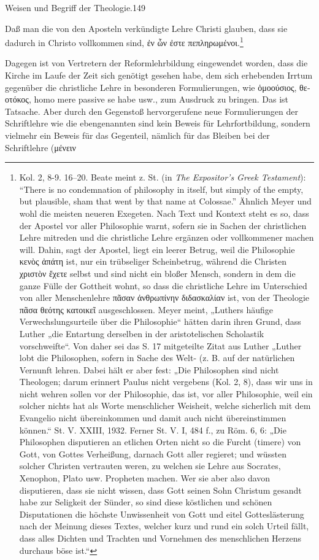 \noindent Weisen und Begriff der Theologie.\hfill 149\par Daß man die von den Aposteln verkündigte Lehre Christi glauben, dass sie dadurch in Christo vollkommen sind, \textgreek{ἐν ὧν ἐστε πεπληρωμένοι}.\footnote[511]{Kol. 2, 8-9. 16–20. Beate meint z. St. (in \emph{The Expositor's Greek Testament}): “There is no condemnation of philosophy in itself, but simply of the empty, but plausible, sham that went by that name at Colossae.” Ähnlich Meyer und wohl die meisten neueren Exegeten. Nach Text und Kontext steht es so, dass der Apostel vor aller Philosophie warnt, sofern sie in Sachen der christlichen Lehre mitreden und die christliche Lehre ergänzen oder vollkommener machen will. Dahin, sagt der Apostel, liegt ein leerer Betrug, weil die Philosophie \textgreek{κενὸς ἀπάτη} ist, nur ein trübseliger Scheinbetrug, während die Christen \textgreek{χριστὸν ἔχετε} selbst und sind nicht ein bloßer Mensch, sondern in dem die ganze Fülle der Gottheit wohnt, so dass die christliche Lehre im Unterschied von aller Menschenlehre \textgreek{πᾶσαν ἀνθρωπίνην διδασκαλίαν} ist, von der Theologie \textgreek{πᾶσα θεότης κατοικεῖ} ausgeschlossen. Meyer meint, „Luthers häufige Verwechslungsurteile über die Philosophie“ hätten darin ihren Grund, dass Luther „die Entartung derselben in der aristotelischen Scholastik vorschweifte“. Von daher sei das S. 17 mitgeteilte Zitat aus Luther „Luther lobt die Philosophen, sofern in Sache des Welt- (z. B. auf der natürlichen Vernunft lehren. Dabei hält er aber fest: „Die Philosophen sind nicht Theologen; darum erinnert Paulus nicht vergebens (Kol. 2, 8), dass wir uns in nicht wehren sollen vor der Philosophie, das ist, vor aller Philosophie, weil ein solcher nichts hat als Worte menschlicher Weisheit, welche sicherlich mit dem Evangelio nicht übereinkommen und damit auch nicht übereinstimmen können.“ St. V. XXIII, 1932. Ferner St. V. I, 484 f., zu Röm. 6, 6: „Die Philosophen disputieren an etlichen Orten nicht so die Furcht (timere) von Gott, von Gottes Verheißung, darnach Gott aller regieret; und wüssten solcher Christen vertrauten weren, zu welchen sie Lehre aus Socrates, Xenophon, Plato usw. Propheten machen. Wer sie aber also davon disputieren, dass sie nicht wissen, dass Gott seinen Sohn Christum gesandt habe zur Seligkeit der Sünder, so sind diese köstlichen und schönen Disputationen die höchste Unwissenheit von Gott und eitel Gotteslästerung nach der Meinung dieses Textes, welcher kurz und rund ein solch Urteil fällt, dass alles Dichten und Trachten und Vornehmen des menschlichen Herzens durchaus böse ist.“}\par Dagegen ist von Vertretern der Reformlehrbildung eingewendet worden, dass die Kirche im Laufe der Zeit sich genötigt gesehen habe, dem sich erhebenden Irrtum gegenüber die christliche Lehre in besonderen Formulierungen, wie \textgreek{ὁμοούσιος}, \textgreek{θεοτόκος}, \textgreek{homo mere passive} se habe usw., zum Ausdruck zu bringen. Das ist Tatsache. Aber durch den Gegenstoß hervorgerufene neue Formulierungen der Schriftlehre wie die ebengenannten sind kein Beweis für Lehrfortbildung, sondern vielmehr ein Beweis für das Gegenteil, nämlich für das Bleiben bei der Schriftlehre (\textgreek{μένειν}